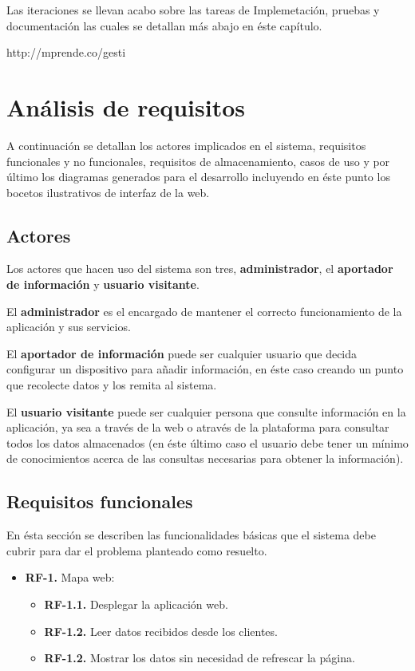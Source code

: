 Las iteraciones se llevan acabo sobre las tareas de Implemetación, pruebas y documentación las cuales se detallan más abajo en éste capítulo.

http://mprende.co/gesti%

\section{Análisis de requisitos}

A continuación se detallan los actores implicados en el sistema, requisitos funcionales y no funcionales, requisitos de almacenamiento, casos de uso y por último los diagramas generados para el desarrollo incluyendo en éste punto los bocetos ilustrativos de interfaz de la web.

\subsection{Actores}

Los actores que hacen uso del sistema son tres, \textbf{administrador}, el \textbf{aportador de información} y \textbf{usuario visitante}.

\bigskip
El \textbf{administrador} es el encargado de mantener el correcto funcionamiento de la aplicación y sus servicios.

\bigskip
El \textbf{aportador de información} puede ser cualquier usuario que decida configurar un dispositivo para añadir información, en éste caso creando un punto que recolecte datos y los remita al sistema.

\bigskip
El \textbf{usuario visitante} puede ser cualquier persona que consulte información en la aplicación, ya sea a través de la web o através de la plataforma para consultar todos los datos almacenados (en éste último caso el usuario debe tener un mínimo de conocimientos acerca de las consultas necesarias para obtener la información).

\subsection{Requisitos funcionales}

En ésta sección se describen las funcionalidades básicas que el sistema debe cubrir para dar el problema planteado como resuelto.

\begin{itemize}
  \item \textbf{RF-1.} Mapa web:
    \begin{itemize}
      \item \textbf{RF-1.1.} Desplegar la aplicación web.
      \item \textbf{RF-1.2.} Leer datos recibidos desde los clientes.
      \item \textbf{RF-1.2.} Mostrar los datos sin necesidad de refrescar la página.
    \end{itemize}
\end{itemize}

